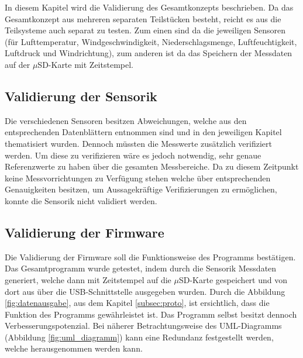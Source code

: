 In diesem Kapitel wird die Validierung des Gesamtkonzepts beschrieben. Da das Gesamtkonzept aus mehreren separaten Teilstücken besteht, reicht es aus die Teilsysteme auch separat zu testen. Zum einen sind da die jeweiligen Sensoren (für Lufttemperatur, Windgeschwindigkeit, Niederschlagsmenge, Luftfeuchtigkeit, Luftdruck und Windrichtung), zum anderen ist da das Speichern der Messdaten auf der $\mu$SD-Karte mit Zeitstempel. 

\subsection{Validierung der Sensorik}
Die verschiedenen Sensoren besitzen Abweichungen, welche aus den entsprechenden Datenblättern entnommen sind und in den jeweiligen Kapitel thematisiert wurden. Dennoch müssten die Messwerte zusätzlich verifiziert werden. Um diese zu verifizieren wäre es jedoch notwendig, sehr genaue Referenzwerte zu haben über die gesamten Messbereiche. Da zu diesem Zeitpunkt keine Messvorrichtungen zu Verfügung stehen welche über entsprechenden Genauigkeiten besitzen, um Aussagekräftige Verifizierungen zu ermöglichen, konnte die Sensorik nicht validiert werden.

\subsection{Validierung der Firmware}
Die Validierung der Firmware soll die Funktionsweise des Programms bestätigen. Das Gesamtprogramm wurde getestet, indem durch die Sensorik Messdaten generiert, welche dann mit Zeitstempel auf die $\mu$SD-Karte gespeichert und von dort aus über die USB-Schnittstelle ausgegeben wurden. Durch die Abbildung \ref{fig:datenausgabe}, aus dem Kapitel \ref{subsec:proto}, ist ersichtlich, dass die Funktion des Programms gewährleistet ist. Das Programm selbst besitzt dennoch Verbesserungspotenzial. Bei näherer Betrachtungsweise des UML-Diagramms (Abbildung \ref{fig:uml_diagramm}) kann eine Redundanz festgestellt werden, welche herausgenommen werden kann.